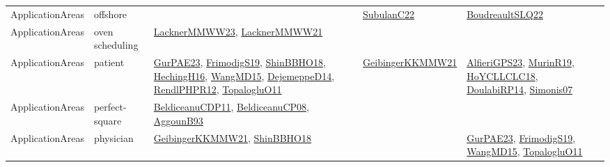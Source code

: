 {\begin{longtable}{lp{3cm}>{\raggedright}p{6cm}>{\raggedright}p{6cm}p{8cm}}
ApplicationAreas & offshore &  & \href{articles/SubulanC22.pdf}{SubulanC22}\cite{SubulanC22} & \href{papers/BoudreaultSLQ22.pdf}{BoudreaultSLQ22}\cite{BoudreaultSLQ22}\\
ApplicationAreas & oven scheduling & \href{articles/LacknerMMWW23.pdf}{LacknerMMWW23}\cite{LacknerMMWW23}, \href{papers/LacknerMMWW21.pdf}{LacknerMMWW21}\cite{LacknerMMWW21} &  & \\
ApplicationAreas & patient & \href{articles/GurPAE23.pdf}{GurPAE23}\cite{GurPAE23}, \href{papers/FrimodigS19.pdf}{FrimodigS19}\cite{FrimodigS19}, \href{articles/ShinBBHO18.pdf}{ShinBBHO18}\cite{ShinBBHO18}, \href{papers/HechingH16.pdf}{HechingH16}\cite{HechingH16}, \href{articles/WangMD15.pdf}{WangMD15}\cite{WangMD15}, \href{papers/DejemeppeD14.pdf}{DejemeppeD14}\cite{DejemeppeD14}, \href{papers/RendlPHPR12.pdf}{RendlPHPR12}\cite{RendlPHPR12}, \href{articles/TopalogluO11.pdf}{TopalogluO11}\cite{TopalogluO11} & \href{papers/GeibingerKKMMW21.pdf}{GeibingerKKMMW21}\cite{GeibingerKKMMW21} & \href{articles/AlfieriGPS23.pdf}{AlfieriGPS23}\cite{AlfieriGPS23}, \href{papers/MurinR19.pdf}{MurinR19}\cite{MurinR19}, \href{papers/HoYCLLCLC18.pdf}{HoYCLLCLC18}\cite{HoYCLLCLC18}, \href{papers/DoulabiRP14.pdf}{DoulabiRP14}\cite{DoulabiRP14}, \href{articles/Simonis07.pdf}{Simonis07}\cite{Simonis07}\\
ApplicationAreas & perfect-square & \href{articles/BeldiceanuCDP11.pdf}{BeldiceanuCDP11}\cite{BeldiceanuCDP11}, \href{papers/BeldiceanuCP08.pdf}{BeldiceanuCP08}\cite{BeldiceanuCP08}, \href{articles/AggounB93.pdf}{AggounB93}\cite{AggounB93} &  & \\
ApplicationAreas & physician & \href{papers/GeibingerKKMMW21.pdf}{GeibingerKKMMW21}\cite{GeibingerKKMMW21}, \href{articles/ShinBBHO18.pdf}{ShinBBHO18}\cite{ShinBBHO18} &  & \href{articles/GurPAE23.pdf}{GurPAE23}\cite{GurPAE23}, \href{papers/FrimodigS19.pdf}{FrimodigS19}\cite{FrimodigS19}, \href{articles/WangMD15.pdf}{WangMD15}\cite{WangMD15}, \href{articles/TopalogluO11.pdf}{TopalogluO11}\cite{TopalogluO11}\\

\end{longtable}}

